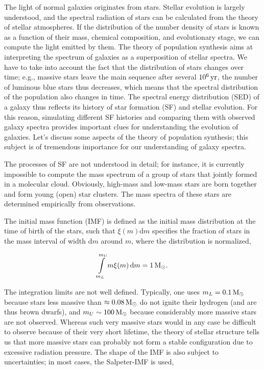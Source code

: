 \documentclass[a4paper,10pt]{article}
\begin{document}
{\noindent}The light of normal galaxies originates from stars. Stellar evolution is largely understood, and the spectral radiation of stars can be calculated from the theory of stellar atmospheres. If the distribution of the number density of stars is known as a function of their mass, chemical composition, and evolutionary stage, we can compute the light emitted by them. The theory of population synthesis aims at interpreting the spectrum of galaxies as a superposition of stellar spectra. We have to take into account the fact that the distribution of stars changes over time; e.g., massive stars leave the main sequence after several $10^6\,{\rm yr}$, the number of luminous blue stars thus decreases, which means that the spectral distribution of the population also changes in time. The spectral energy distribution (SED) of a galaxy thus reflects its history of star formation (SF) and stellar evolution. For this reason, simulating different SF histories and comparing them with observed galaxy spectra provides important clues for understanding the evolution of galaxies. Let's discuss some aspects of the theory of population synthesis; this subject is of tremendous importance for our understanding of galaxy spectra.

{\noindent}The processes of SF are not understood in detail; for instance, it is currently impossible to compute the mass spectrum of a group of stars that jointly formed in a molecular cloud. Obviously, high-mass and low-mass stars are born together and form young (open) star clusters. The mass spectra of these stars are determined empirically from observations.

{\noindent}The initial mass function (IMF) is defined as the initial mass distribution at the time of birth of the stars, such that $\xi(m)\mathrm{d}m$ specifies the fraction of stars in the mass interval of width $\mathrm{d}m$ around $m$, where the distribution is normalized,

\begin{align*}
    \int\limits_{m_L}^{m_U} m\xi(m)\,\mathrm{d}m = 1\,{\rm M}_\odot.
\end{align*}

{\noindent}The integration limits are not well defined. Typically, one uses $m_L=0.1\,{\rm M_\odot}$ because stars less massive than $\approx0.08\,{\rm M_\odot}$ do not ignite their hydrogen (and are thus brown dwarfs), and $m_U\sim100\,{\rm M_\odot}$ because considerably more massive stars are not observed. Whereas such very massive stars would in any case be difficult to observe because of their very short lifetime, the theory of stellar structure tells us that more massive stars can probably not form a stable configuration due to excessive radiation pressure. The shape of the IMF is also subject to uncertainties; in most cases, the Salpeter-IMF is used,
\end{document}
